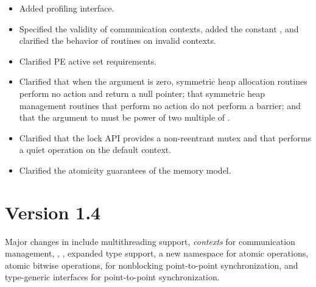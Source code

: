 \begin{itemize}
  .
%
%
\item Added \openshmem profiling interface.
%
%
\item Specified the validity of communication contexts, added the constant
  , and clarified the behavior of
   routines on invalid contexts.
%
%
\item Clarified \ac{PE} active set requirements.
%
%
\item Clarified that when the  argument is zero, symmetric heap
    allocation routines perform no action and return a null pointer; that
    symmetric heap management routines that perform no action do not perform a
    barrier; and that the  argument to  must
    be power of two multiple of .
%
%
\item Clarified that the \openshmem lock \ac{API} provides a non-reentrant mutex and
    that  performs a quiet operation on the default
    context.
%
%
\item Clarified the atomicity guarantees of the \openshmem memory model.
%
%
\end{itemize}

\section{Version 1.4}
Major changes in \openshmem[1.4] include
multithreading support,
\emph{contexts} for communication management,
,
,
expanded type support,
a new namespace for atomic operations,
atomic bitwise operations,
 for nonblocking point-to-point synchronization,
and \Cstd[11] type-generic interfaces for point-to-point synchronization.

